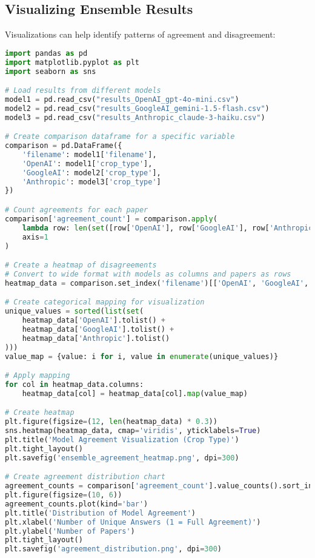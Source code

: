 
\subsection{Visualizing Ensemble Results}

Visualizations can help identify patterns of agreement and disagreement:

\begin{commandbox}
\begin{lstlisting}[language=Python]
import pandas as pd
import matplotlib.pyplot as plt
import seaborn as sns

# Load results from different models
model1 = pd.read_csv("results_OpenAI_gpt-4o-mini.csv")
model2 = pd.read_csv("results_GoogleAI_gemini-1.5-flash.csv")
model3 = pd.read_csv("results_Anthropic_claude-3-haiku.csv")

# Create comparison dataframe for a specific variable
comparison = pd.DataFrame({
    'filename': model1['filename'],
    'OpenAI': model1['crop_type'],
    'GoogleAI': model2['crop_type'],
    'Anthropic': model3['crop_type']
})

# Count agreements for each paper
comparison['agreement_count'] = comparison.apply(
    lambda row: len(set([row['OpenAI'], row['GoogleAI'], row['Anthropic']])),
    axis=1
)

# Create a heatmap of disagreements
# Convert to wide format with models as columns and papers as rows
heatmap_data = comparison.set_index('filename')[['OpenAI', 'GoogleAI', 'Anthropic']]

# Create categorical mapping for visualization
unique_values = sorted(list(set(
    heatmap_data['OpenAI'].tolist() +
    heatmap_data['GoogleAI'].tolist() +
    heatmap_data['Anthropic'].tolist()
)))
value_map = {value: i for i, value in enumerate(unique_values)}

# Apply mapping
for col in heatmap_data.columns:
    heatmap_data[col] = heatmap_data[col].map(value_map)

# Create heatmap
plt.figure(figsize=(12, len(heatmap_data) * 0.3))
sns.heatmap(heatmap_data, cmap='viridis', yticklabels=True)
plt.title('Model Agreement Visualization (Crop Type)')
plt.tight_layout()
plt.savefig('ensemble_agreement_heatmap.png', dpi=300)

# Create agreement distribution chart
agreement_counts = comparison['agreement_count'].value_counts().sort_index()
plt.figure(figsize=(10, 6))
agreement_counts.plot(kind='bar')
plt.title('Distribution of Model Agreement')
plt.xlabel('Number of Unique Answers (1 = Full Agreement)')
plt.ylabel('Number of Papers')
plt.tight_layout()
plt.savefig('agreement_distribution.png', dpi=300)
\end{lstlisting}
\end{commandbox}

